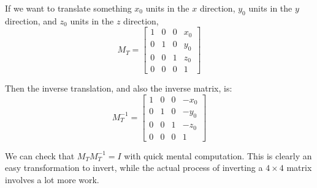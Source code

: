 \documentclass[10pt,twocolumn]{article}
\begin{document}
\begin{framed}
If we want to translate something $x_0$ units in the $x$ direction, $y_0$ units in the $y$ direction, and $z_0$ units in the $z$ direction,
\[M_T = \begin{bmatrix}
    1 & 0 & 0 & x_0 \\
    0 & 1 & 0 & y_0 \\
    0 & 0 & 1 & z_0 \\
    0 & 0 & 0 & 1
\end{bmatrix} \]

Then the inverse translation, and also the inverse matrix, is:
\[M_T^{-1} = \begin{bmatrix}
    1 & 0 & 0 & -x_0 \\
    0 & 1 & 0 & -y_0 \\
    0 & 0 & 1 & -z_0 \\
    0 & 0 & 0 & 1
\end{bmatrix} \]

We can check that $M_T M_T^{-1} = I$ with quick mental computation. This is clearly an easy transformation to invert, while the actual process of inverting a $4\times 4$ matrix involves a lot more work.
\end{framed}
\end{document}
